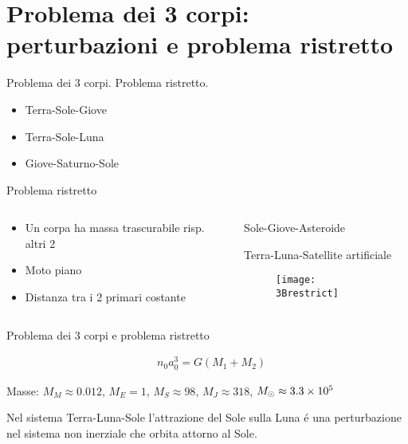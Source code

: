 \section{Problema dei 3 corpi: perturbazioni e problema ristretto}

\begin{frame}{Problema dei 3 corpi. Problema ristretto.}

\begin{itemize}
\item Terra-Sole-Giove
\item Terra-Sole-Luna
\item Giove-Saturno-Sole
\end{itemize}

\begin{block}{Problema ristretto}

\begin{columns}

\begin{column}{0.5\textwidth}

\begin{itemize}
\item Un corpa ha massa trascurabile risp. altri 2
\item Moto piano
\item Distanza tra i 2 primari costante
\end{itemize}

\end{column}


\begin{column}{0.5\textwidth}

Sole-Giove-Asteroide

Terra-Luna-Satellite artificiale

\begin{figure}

\texttt{[image: 3Brestrict]}

\end{figure}

\end{column}

\end{columns}

\end{block}

\end{frame}

\begin{wordonframe}{Problema dei 3 corpi e problema ristretto}

\begin{align*}
&n_0a_0^3=G(M_1+M_2)
\end{align*}

Masse: $M_M\approx0.012$, $M_E=1$, $M_S\approx98$, $M_J\approx318$, $M_{\odot}{}\approx\num{3.3e5}$



Nel sistema Terra-Luna-Sole l'attrazione del Sole sulla Luna \'e una perturbazione nel sistema non inerziale che orbita attorno al Sole. 


\end{wordonframe}


